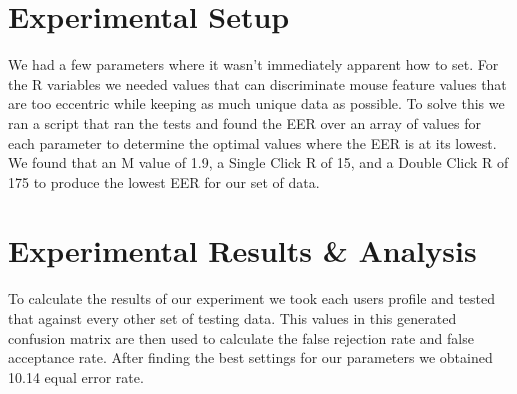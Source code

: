 \documentclass[conference]{IEEEtran}
\begin{document}
\section{Experimental Setup}
We had a few parameters where it wasn’t immediately apparent how to set. For the R variables we needed values that can discriminate mouse feature values that are too eccentric while keeping as much unique data as possible. To solve this we ran a script that ran the tests and found the EER over an array of values for each parameter to determine the optimal values where the EER is at its lowest. We found that an M value of 1.9, a Single Click R of 15, and a Double Click R of 175 to produce the lowest EER for our set of data.

\bgroup
\def\arraystretch{1.5}
\egroup
{}

\section{Experimental Results \& Analysis}
To calculate the results of our experiment we took each users profile and tested that against every other set of testing data. This values in this generated confusion matrix are then used to calculate the false rejection rate and false acceptance rate. After finding the best settings for our parameters we obtained 10.14 equal error rate. 

\bgroup
\def\arraystretch{1.5}
\egroup
{}
\end{document}
